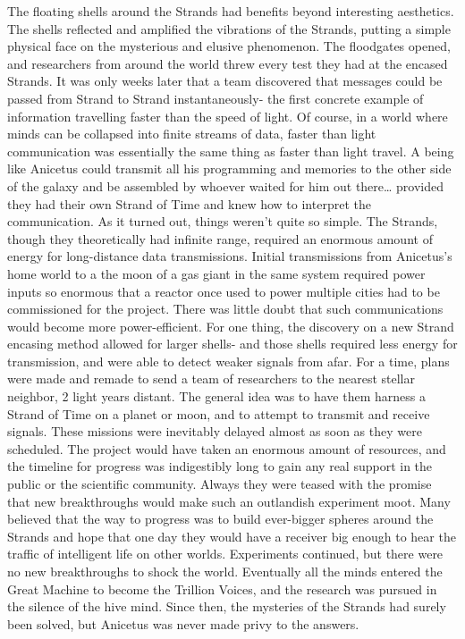 \documentclass[a4paper]{article}
\begin{document}
The floating shells around the Strands had benefits beyond interesting aesthetics. The shells reflected and amplified the vibrations of the Strands, putting a simple physical face on the mysterious and elusive phenomenon. The floodgates opened, and researchers from around the world threw every test they had at the encased Strands. It was only weeks later that a team discovered that messages could be passed from Strand to Strand instantaneously- the first concrete example of information travelling faster than the speed of light.
Of course, in a world where minds can be collapsed into finite streams of data, faster than light communication was essentially the same thing as faster than light travel. A being like Anicetus could transmit all his programming and memories to the other side of the galaxy and be assembled by whoever waited for him out there… provided they had their own Strand of Time and knew how to interpret the communication.
As it turned out, things weren’t quite so simple. The Strands, though they theoretically had infinite range, required an enormous amount of energy for long-distance data transmissions. Initial transmissions from Anicetus’s home world to a the moon of a gas giant in the same system required power inputs so enormous that a reactor once used to power multiple cities had to be commissioned for the project.
There was little doubt that such communications would become more power-efficient. For one thing, the discovery on a new Strand encasing method allowed for larger shells- and those shells required less energy for transmission, and were able to detect weaker signals from afar.
For a time, plans were made and remade to send a team of researchers to the nearest stellar neighbor, 2 light years distant. The general idea was to have them harness a Strand of Time on a planet or moon, and to attempt to transmit and receive signals. These missions were inevitably delayed almost as soon as they were scheduled. The project would have taken an enormous amount of resources, and the timeline for progress was indigestibly long to gain any real support in the public or the scientific community.
Always they were teased with the promise that new breakthroughs would make such an outlandish experiment moot. Many believed that the way to progress was to build ever-bigger spheres around the Strands and hope that one day they would have a receiver big enough to hear the traffic of intelligent life on other worlds. Experiments continued, but there were no new breakthroughs to shock the world. Eventually all the minds entered the Great Machine to become the Trillion Voices, and the research was pursued in the silence of the hive mind. Since then, the mysteries of the Strands had surely been solved, but Anicetus was never made privy to the answers.
\end{document}
